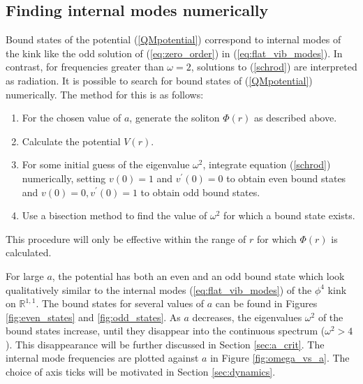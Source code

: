 \subsection{Finding internal modes numerically}
\label{sec:finding_bound_states_numerically}
Bound states of the potential (\ref{QMpotential}) correspond to internal modes of the kink like the odd solution of (\ref{eq:zero_order}) in (\ref{eq:flat_vib_modes}). In contrast, for frequencies greater than $\omega = 2$, solutions to (\ref{schrod}) are interpreted as radiation. It is possible to search for bound states of (\ref{QMpotential}) numerically. The method for this is as follows:
\begin{enumerate}
\item For the chosen value of $a$, generate the soliton $\Phi(r)$ as described above.
\item Calculate the potential $V(r)$.
\item For some initial guess of the eigenvalue $\omega^2$, integrate equation ({\ref{schrod}}) numerically, setting $v(0)=1$ and $v^\prime (0)=0$ to obtain even bound states and $v(0)=0,v^\prime(0)=1$ to obtain odd bound states.
\item Use a bisection method to find the value of $\omega^2$ for which a bound state exists.
\end{enumerate}
This procedure will only be effective within the range of $r$ for which $\Phi(r)$ is calculated.

For large $a$, the potential has both an even and an odd bound state which look qualitatively similar to the internal modes (\ref{eq:flat_vib_modes}) of the $\phi^4$ kink on $\mathbb{R}^{1,1}$. The bound states for several values of $a$ can be found in Figures \ref{fig:even_states} and \ref{fig:odd_states}. As $a$ decreases, the eigenvalues $\omega^2$ of the bound states increase, until they disappear into the continuous spectrum ($\omega^2>4$). This disappearance will be further discussed in Section \ref{sec:a_crit}. The internal mode frequencies are plotted against $a$ in Figure \ref{fig:omega_vs_a}. The choice of axis ticks will be motivated in Section \ref{sec:dynamics}.


